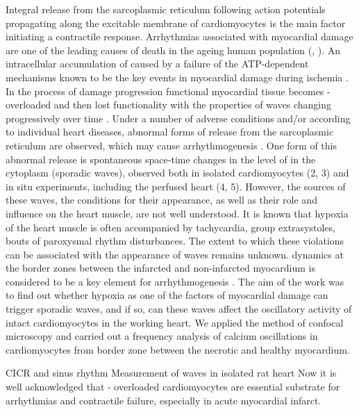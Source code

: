 \documentclass{biophys-new}
\begin{document}
Integral  release from the sarcoplasmic reticulum following action potentials propagating along the excitable membrane of cardiomyocytes is the main factor initiating a contractile response.
Arrhythmias associated with myocardial damage are one of the leading causes of death in the ageing human population (\cite{xiao2011cardiac}, \cite{}).
An intracellular accumulation of  caused by a failure of the ATP-dependent mechanisms known to be the key events in myocardial damage during ischemia \cite{shen1972myocardial,shen1972kinetics,nayler1981role}.
In the process of damage progression functional myocardial tissue becomes -overloaded and then lost functionality with the properties of  waves changing progressively over time \cite{minamikawa1997situ,hama1998real}.
Under a number of adverse conditions and/or according to individual heart diseases, abnormal forms of  release from the sarcoplasmic reticulum are observed, which may cause arrhythmogenesis \cite{ishide1990propagation}.
One form of this abnormal release is spontaneous space-time changes in the level of  in the cytoplasm (sporadic  waves), observed both in isolated cardiomyocytes (2, 3) and in situ experiments, including the perfused heart (4, 5).
However, the sources of these waves, the conditions for their appearance, as well as their role and influence on the heart muscle, are not well understood.
It is known that hypoxia of the heart muscle is often accompanied by tachycardia, group extrasystoles, bouts of paroxysmal rhythm disturbances.
The extent to which these violations can be associated with the appearance of  waves remains unknown.
 dynamics at the border zones between the infarcted and non-infarcted myocardium is considered to be a key element for arrhythmogenesis \cite{takamatsu2008arrhythmogenic}.
The aim of the work was to find out whether hypoxia as one of the factors of myocardial damage can trigger sporadic  waves, and if so, can these waves affect the oscillatory activity of intact cardiomyocytes in the working heart.
We applied the method of confocal microscopy and carried out a frequency analysis of calcium oscillations in cardiomyocytes from border zone between the necrotic and healthy myocardium.


CICR and sinus rhythm
Measurement of  waves in isolated rat heart
Now it is well acknowledged that  - overloaded cardiomyocytes are essential substrate for arrhythmias and contractile failure, especially in acute myocardial infarct.
\end{document}
